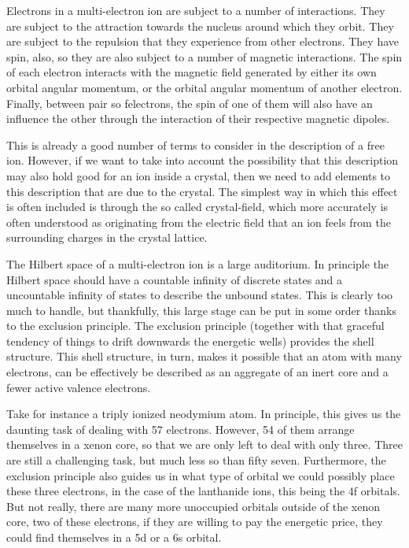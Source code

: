\documentclass{article}
\begin{document}
\begin{multicols}{2}

Electrons in a multi-electron ion are subject to a number of interactions. They are subject to the attraction towards the nucleus around which they orbit. They are subject to the repulsion that they experience from other electrons. They have spin, also, so they are also subject to a number of magnetic interactions. The spin of each electron interacts with the magnetic field generated by either its own orbital angular momentum, or the orbital angular momentum of another electron. Finally, between pair so felectrons, the spin of one of them will also have an influence the other through the interaction of their respective magnetic dipoles.

This is already a good number of terms to consider in the description of a free ion. However, if we want to take into account the possibility that this description may also hold good for an ion inside a crystal, then we need to add elements to this description that are due to the crystal. The simplest way in which this effect is often included is through the so called crystal-field, which more accurately is often understood as originating from the electric field that an ion feels from the surrounding charges in the crystal lattice.

The Hilbert space of a multi-electron ion is a large auditorium. In principle the Hilbert space should have a countable infinity of discrete states and a uncountable infinity of states to describe the unbound states. This is clearly too much to handle, but thankfully, this large stage can be put in some order thanks to the exclusion principle. The exclusion principle (together with that graceful tendency of things to drift downwards the energetic wells) provides the shell structure. This shell structure, in turn, makes it possible that an atom with many electrons, can be effectively be described as an aggregate of an inert core and a fewer active valence electrons.  

Take for instance a triply ionized neodymium atom. In principle, this gives us the daunting task of dealing with 57 electrons. However, 54 of them arrange themselves in a xenon core, so that we are only left to deal with only three. Three are still a challenging task, but much less so than fifty seven. Furthermore, the exclusion principle also guides us in what type of orbital we could possibly place these three electrons, in the case of the lanthanide ions, this being the 4f orbitals. But not really, there are many more unoccupied orbitals outside of the xenon core, two of these electrons, if they are willing to pay the energetic price, they could find themselves in a 5d or a 6s orbital.  


\end{multicols}
\end{document}
